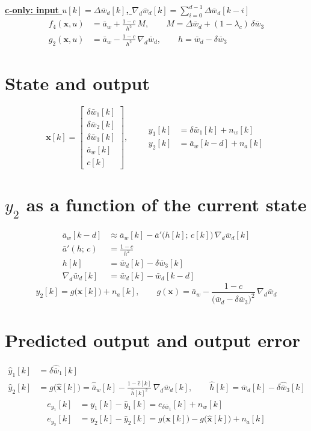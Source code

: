 \documentclass[11pt,a4paper]{ctexart}
\newcommand{\ba}{\bar{a}}
\newcommand{\bw}{\bar{w}}
\newcommand{\ap}{\ba'}
\newcommand{\ah}{\hat{\ba}_w}
\newcommand{\wh}{\hat{\bw}}
\newcommand{\hh}{\hat{h}}
\newcommand{\ch}{\hat{c}}
\newcommand{\hd}[1]{\par\bigskip\noindent\underline{\textbf{#1}}}
\begin{document}
\hd{c-only: input $u[k] = \Delta\bw_d[k]$, $\nabla_d\bw_d[k] = \sum_{i=0}^{d-1} \Delta\bw_d[k-i]$}
\[
\begin{aligned}
f_4(\mathbf{x},u) &= \ba_w + \frac{1-c}{h^{2}}\,M, \qquad M = \Delta\bw_d + (1-\lambda_c)\,\delta\bw_3 \\
g_2(\mathbf{x},u) &= \ba_w - \frac{1-c}{h^{2}}\,\nabla_d\bw_d, \qquad h = \bw_d - \delta\bw_3
\end{aligned}
\]

\section{State and output}
\[
\mathbf{x}[k] = \begin{bmatrix} \delta\bw_1[k] \\ \delta\bw_2[k] \\ \delta\bw_3[k] \\ \ba_w[k] \\ c[k] \end{bmatrix},
\qquad
\begin{aligned}
y_1[k] &= \delta\bw_1[k] + n_w[k] \\
y_2[k] &= \ba_w[k-d] + n_a[k]
\end{aligned}
\]

\section{$y_2$ as a function of the current state}
\[
\begin{aligned}
\ba_w[k-d] &\approx \ba_w[k] - \ap\big(h[k];\,c[k]\big)\,\nabla_d\bw_d[k] \\
\ap(h;\,c) &= \frac{1-c}{h^{2}} \\
h[k] &= \bw_d[k] - \delta\bw_3[k] \\
\nabla_d\bw_d[k] &= \bw_d[k] - \bw_d[k-d]
\end{aligned}
\]
\[
y_2[k] = g\big(\mathbf{x}[k]\big) + n_a[k], \qquad
g(\mathbf{x}) = \ba_w - \frac{1-c}{\big(\bw_d - \delta\bw_3\big)^{2}}\,\nabla_d\bw_d
\]

\section{Predicted output and output error}
\[
\begin{aligned}
\hat y_1[k] &= \delta\wh_1[k] \\
\hat y_2[k] &= g\big(\hat{\mathbf{x}}[k]\big) = \ah[k] - \frac{1-\ch[k]}{\hh[k]^{2}}\,\nabla_d\bw_d[k], \qquad \hh[k] = \bw_d[k] - \delta\wh_3[k]
\end{aligned}
\]
\[
\begin{aligned}
e_{y_1}[k] &= y_1[k] - \hat y_1[k] = e_{\delta\bw_1}[k] + n_w[k] \\
e_{y_2}[k] &= y_2[k] - \hat y_2[k] = g\big(\mathbf{x}[k]\big) - g\big(\hat{\mathbf{x}}[k]\big) + n_a[k]
\end{aligned}
\]
\end{document}
